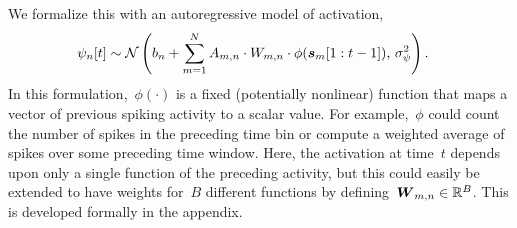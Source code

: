 We formalize this with an autoregressive model of activation,
\begin{align}
\psi_{n}[t] &\sim \mathcal{N}\left( b_n + \sum_{m=1}^N A_{m,n} \cdot W_{m,n} \cdot \phi(\boldsymbol{s}_m[1:t-1]), \, \sigma_\psi^2 \right).
\end{align}
In this formulation,~$\phi(\cdot)$ is a fixed (potentially nonlinear) function that maps a vector of previous spiking activity to a scalar value. For example,~$\phi$ could count the number of spikes in the preceding time bin or compute a weighted average of spikes over some preceding time window. Here, the activation at time~$t$ depends upon only a single function of the preceding activity, but this could easily be extended to have weights for~$B$ different functions by defining~$\boldsymbol{W}_{m,n} \in \mathbb{R}^B$.
This is developed formally in the appendix.

